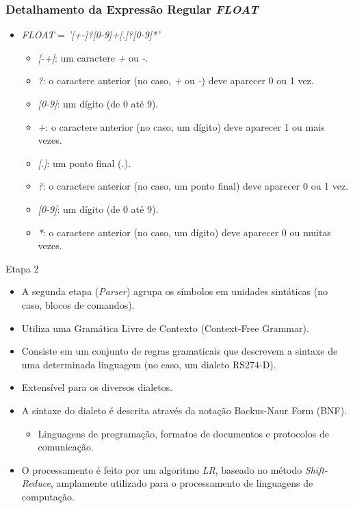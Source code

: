 \documentclass[aspectratio=169]{beamer}
\begin{document}
{  \begin{frame}
    \frametitle{Detalhamento da Expressão Regular \emph{FLOAT}}
    \begin{itemize}
      \item \emph{FLOAT} = \emph{'[+-]?[0-9]+[.]?[0-9]*'}
        \begin{itemize}
          \item \emph{[-+]}: um caractere \emph{+} ou \emph{-}.
          \item \emph{?}: o caractere anterior (no caso, \emph{+} ou \emph{-}) deve aparecer 0 ou 1 vez.
          \item \emph{[0-9]}: um dígito (de 0 até 9).
          \item \emph{+}: o caractere anterior (no caso, um dígito) deve aparecer 1 ou mais vezes.
          \item \emph{[.]}: um ponto final (\emph{.}).
          \item \emph{?}: o caractere anterior (no caso, um ponto final) deve aparecer 0 ou 1 vez.
          \item \emph{[0-9]}: um dígito (de 0 até 9).
          \item \emph{*}: o caractere anterior (no caso, um dígito) deve aparecer 0 ou muitas vezes.
      \end{itemize}
    \end{itemize}
\end{frame}


\begin{frame}{Etapa 2}
  \begin{itemize}
    \item A segunda etapa (\emph{Parser}) agrupa os símbolos em unidades 
          sint\'aticas (no caso, blocos de comandos).
    \item Utiliza uma Gramática Livre de Contexto (Context-Free Grammar).
    \item Consiste em um conjunto de regras gramaticais que descrevem a 
          sintaxe de uma determinada linguagem (no caso, um dialeto RS274-D).
    \item Extensível para os diversos dialetos.
    \item A sintaxe do dialeto é descrita através da notação Backus-Naur 
          Form (BNF).
    \begin{itemize}
      \item Linguagens de programação, formatos de documentos e 
            protocolos de comunicação.
    \end{itemize}
    \item O processamento é feito por um algoritmo \emph{LR}, baseado no método 
          \emph{Shift-Reduce}, amplamente utilizado para o processamento 
          de linguagens de computação.
  \end{itemize}
\end{frame}


}
\end{document}
